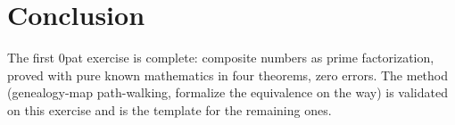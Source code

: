 \documentclass[sigplan,10pt,anonymous,review]{acmart}
\begin{document}
\section{Conclusion}

The first 0pat exercise is complete: composite numbers as prime
factorization, proved with pure known mathematics in four theorems, zero
errors. The method (genealogy-map path-walking, formalize the equivalence
on the way) is validated on this exercise and is the template for the
remaining ones.



\end{document}
